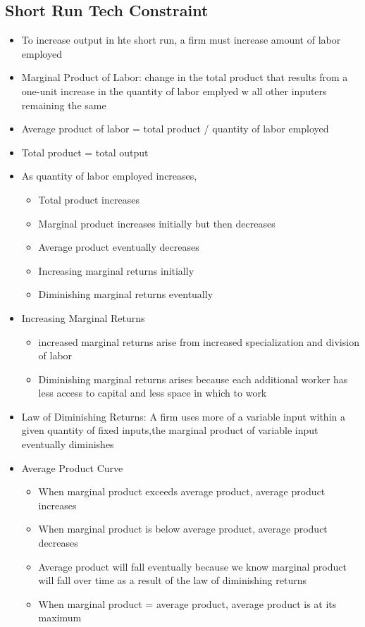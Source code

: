 \documentclass[11pt]{article}
\begin{document}
\subsection{Short Run Tech Constraint}
\label{sec:org13057d7}
\begin{itemize}
\item To increase output in hte short run, a firm must increase amount of labor employed
\item Marginal Product of Labor: change in the total product that results from a one-unit increase in the quantity of labor emplyed w all other inputers remaining the same
\item Average product of labor = total product / quantity of labor employed
\item Total product = total output
\item As quantity of labor employed increases,
\begin{itemize}
\item Total product increases
\item Marginal product increases initially but then decreases
\item Average product eventually decreases
\item Increasing marginal returns initially
\item Diminishing marginal returns eventually
\end{itemize}
\item Increasing Marginal Returns
\begin{itemize}
\item increased marginal returns arise from increased specialization and division of labor
\item Diminishing marginal returns arises because each additional worker has less access to capital and less space in which to work
\end{itemize}
\item Law of Diminishing Returns: A firm uses more of a variable input within a given quantity of fixed inputs,the marginal product of variable input eventually diminishes
\item Average Product Curve
\begin{itemize}
\item When marginal product exceeds average product, average product increases
\item When marginal product is below average product, average product decreases
\item Average product will fall eventually because we know marginal product will fall over time as a result of the law of diminishing returns
\item When marginal product = average product, average product is at its maximum
\end{itemize}
\end{itemize}
\end{document}
